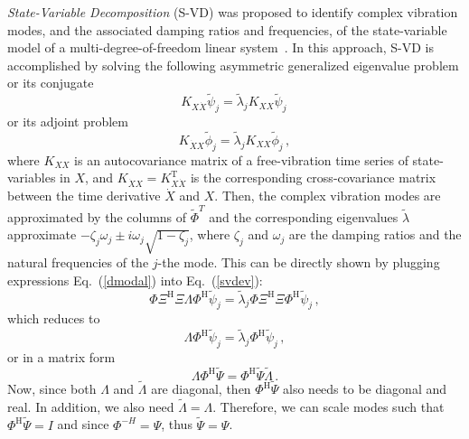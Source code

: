 \documentclass[10pt]{article}
\newcommand{\eq}[1]{Eq.\ (\ref{#1})}
\begin{document}
{\em State-Variable Decomposition} (S-VD) was proposed to identify complex vibration modes, and the associated damping ratios and frequencies, of the state-variable model of a multi-degree-of-freedom linear system~\cite{feeny2008}. 
In this approach, S-VD is accomplished by solving the following asymmetric generalized eigenvalue problem or its conjugate
\begin{equation}\label{svdev}
    K_{X\dot X} \tilde \psi_j = \tilde \lambda_{j} K_{XX} \tilde \psi_j\,
\end{equation}
 or its adjoint problem
\begin{equation}\label{svdev2}
    K_{\dot XX} \tilde \phi_j = \tilde \lambda_{j} K_{XX} \tilde \phi_j\,,
\end{equation}
where $K_{XX}$ is an autocovariance matrix of a free-vibration time series of state-variables in $X$, and $K_{\Dot XX}=K_{X\Dot X}^\mathrm{T}$ is the corresponding cross-covariance matrix between the time derivative $\dot X$ and $X$.
Then, the complex vibration modes are approximated by the columns of $\tilde \Phi^T$ and the corresponding eigenvalues $\tilde \lambda$ approximate $-\zeta_{j}\omega_{j} \pm i\omega_{j}\sqrt{1-\zeta_{j}}$, where $\zeta_{j}$ and $\omega_{j}$ are the damping ratios and the natural frequencies of the $j$-the mode.
This can be directly shown by plugging expressions \eq{dmodal} into \eq{svdev}:
\begin{equation}
    \Phi\Xi  
    ^\mathrm{H} \Xi \Lambda \Phi^\mathrm{H} \tilde \psi_j
 = \tilde \lambda_{j}\Phi\Xi^\textrm{H}\Xi
    \Phi^\textrm{H} \tilde \psi_j\,, 
\end{equation}
which reduces to
\begin{equation}
    \Lambda \Phi^\mathrm{H} \tilde \psi_j
 = \tilde \lambda_{j}
    \Phi^\textrm{H} \tilde \psi_j\,, 
\end{equation}
or in a matrix form
\begin{equation}
    \Lambda \Phi^\mathrm{H} \tilde \Psi
 = \Phi^\textrm{H} \tilde \Psi \tilde \Lambda \,.
\end{equation}
Now, since both $\Lambda$ and $\tilde \Lambda$ are diagonal, then $\Phi^\mathrm{H} \tilde \Psi$ also needs to be diagonal and real.
In addition, we also need $\tilde\Lambda = \Lambda$.
Therefore, we can scale modes such that $\Phi^\mathrm{H} \tilde \Psi = I$ and since $\Phi^{-H} = \Psi$, thus $\tilde \Psi=\Psi$.
\end{document}
